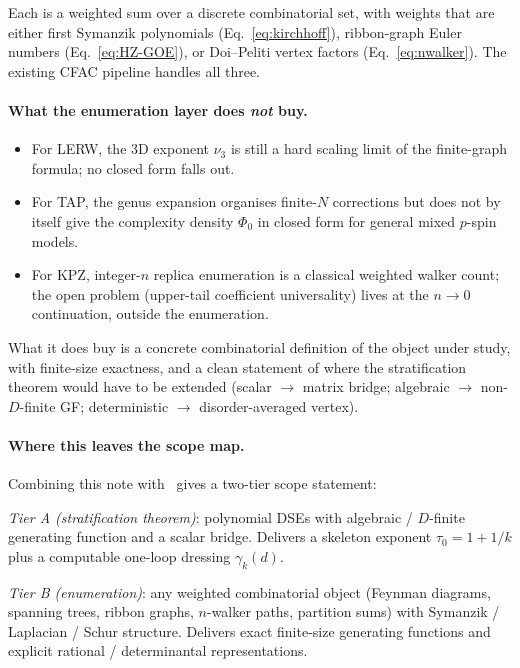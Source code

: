 \documentclass[10pt,a4paper,twocolumn]{article}
\theoremstyle{plain}
\theoremstyle{definition}
\begin{document}
Each is a weighted sum over a discrete combinatorial set, with
weights that are either first Symanzik polynomials
(Eq.~\eqref{eq:kirchhoff}), ribbon-graph Euler numbers
(Eq.~\eqref{eq:HZ-GOE}), or Doi--Peliti vertex factors
(Eq.~\eqref{eq:nwalker}).  The existing CFAC pipeline handles all
three.

\paragraph{What the enumeration layer does \emph{not} buy.}
\begin{itemize}[leftmargin=*]
\item For LERW, the 3D exponent $\nu_3$ is still a hard scaling
  limit of the finite-graph formula; no closed form falls out.
\item For TAP, the genus expansion organises finite-$N$ corrections
  but does not by itself give the complexity density $\Phi_0$ in
  closed form for general mixed $p$-spin models.
\item For KPZ, integer-$n$ replica enumeration is a classical
  weighted walker count; the open problem (upper-tail coefficient
  universality) lives at the $n \to 0$ continuation, outside the
  enumeration.
\end{itemize}

What it does buy is a concrete combinatorial definition of the object
under study, with finite-size exactness, and a clean statement of
where the stratification theorem would have to be extended (scalar
$\to$ matrix bridge; algebraic $\to$ non-$D$-finite GF;
deterministic $\to$ disorder-averaged vertex).

\paragraph{Where this leaves the scope map.}
Combining this note with~\citep[\S7, \S8]{AmarteifioMannaC3} gives a
two-tier scope statement:

\begin{slotbox}
\emph{Tier A (stratification theorem)}: polynomial DSEs with
algebraic / $D$-finite generating function and a scalar bridge.
Delivers a skeleton exponent $\tau_0 = 1 + 1/k$ plus a computable
one-loop dressing $\gamma_k(d)$.

\emph{Tier B (enumeration)}: any weighted combinatorial object
(Feynman diagrams, spanning trees, ribbon graphs, $n$-walker paths,
partition sums) with Symanzik / Laplacian / Schur structure.
Delivers exact finite-size generating functions and explicit rational
/ determinantal representations.
\end{slotbox}
\end{document}
